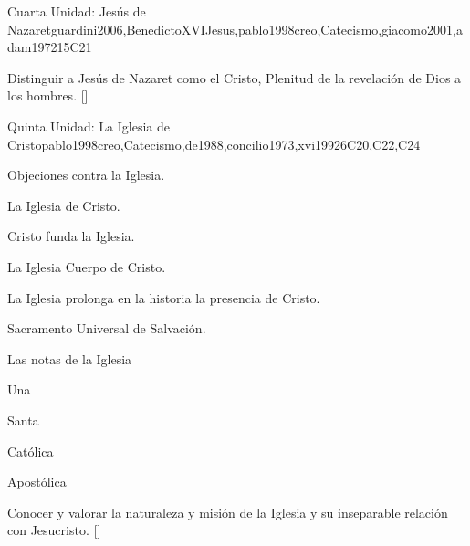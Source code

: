 \begin{syllabus}
\begin{unit}{}{Cuarta Unidad: Jesús de Nazaret}{guardini2006,BenedictoXVIJesus,pablo1998creo,Catecismo,giacomo2001,adam1972}{15}{C21}
\begin{topics}
\end{topics}
\begin{learningoutcomes}
	\item Distinguir a Jesús de Nazaret como el Cristo, Plenitud de la revelación de Dios a los hombres. [\Familiarity]
\end{learningoutcomes}
\end{unit}

\begin{unit}{}{Quinta Unidad: La Iglesia de Cristo}{pablo1998creo,Catecismo,de1988,concilio1973,xvi1992}{6}{C20,C22,C24}
\begin{topics}
	\item Objeciones contra la Iglesia.
	\item La Iglesia de Cristo.
	    \begin{subtopics}
		\item Cristo funda la Iglesia.
		\item La Iglesia Cuerpo de Cristo.
		\item La Iglesia prolonga en la historia la presencia de Cristo.
		\item Sacramento Universal de Salvación.
	    \end{subtopics}

	\item Las notas de la Iglesia
		\begin{subtopics}
		\item Una
		\item Santa
		\item Católica
		\item Apostólica
	    \end{subtopics}
\end{topics}
\begin{learningoutcomes}
	\item Conocer y valorar la naturaleza y misión de la Iglesia y su inseparable relación con Jesucristo. [\Familiarity]
\end{learningoutcomes}
\end{unit}



\begin{coursebibliography}
\end{coursebibliography}

\end{syllabus}
